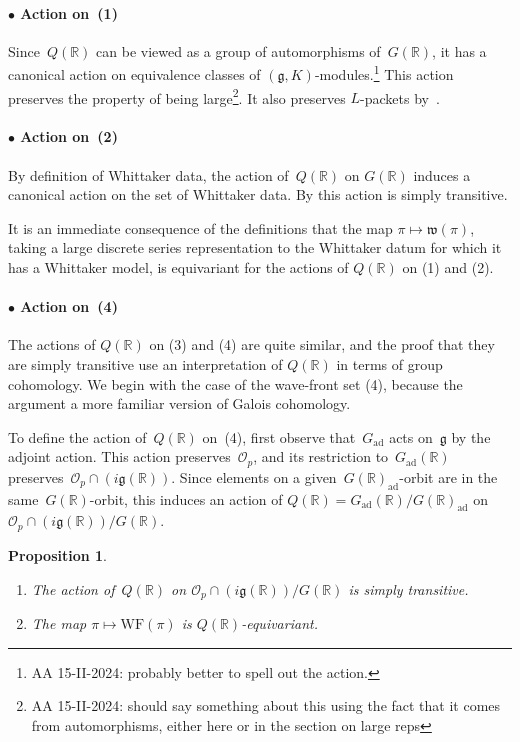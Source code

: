 \documentclass[10pt,leqno]{article}
\newtheorem{proposition}[equation]{Proposition}
\newcommand{\Gad}{G_\mathrm{ad}}
\renewcommand{\O}{\mathcal O}
\newcommand{\R}{\mathbb R}
\newcommand{\g}{\mathfrak g}
\newcommand{\w}{\mathfrak w}
\newcommand{\WF}{\mathrm{WF}}
\newcommand{\Op}{\O_p}
\begin{document}
\paragraph*{$\bullet$ Action on~(1)} Since~$Q(\R)$ can be viewed as a group of automorphisms of~$G(\R)$,  it has a canonical action on equivalence classes of $(\g, K)$-modules.\footnote{AA 15-II-2024: probably better to spell out the action.} This action preserves  the property of being large\footnote{AA 15-II-2024: should say something about this using the fact that it comes from automorphisms, either here or in the section on large reps}. It also preserves $L$-packets by~\cite[Lemma 6.18]{Contragredient}.

\paragraph*{$\bullet$ Action on~(2)}  By definition of Whittaker data, the action of~$Q(\R)$ on $G(\R)$ induces a canonical action on the set of Whittaker data. By \cite[(14.15)]{abv} this action is simply transitive. 

It is an immediate consequence of the definitions that the map $\pi \mapsto \w(\pi)$, taking a large discrete series representation to the Whittaker datum for which it has a Whittaker model, is equivariant for the actions of $Q(\R)$ on (1) and (2). 


\paragraph*{$\bullet$ Action on~(4)} The actions of $Q(\R)$ on (3) and (4) are quite similar, and the proof that they are simply transitive use an interpretation of $Q(\R)$ in terms of group cohomology. 
We begin with the case of the wave-front set (4), because the argument a more familiar version of  Galois cohomology. 

To define the action of~$Q(\R)$ on~(4), first observe that~$\Gad$ acts on~$\g$ by the adjoint action. This action preserves~$\Op$, and its restriction to~$\Gad(\R)$ preserves~$\Op\cap (i\g(\R))$. Since elements on a given~$G(\R)_{\mathrm{ad}}$-orbit are in the same~$G(\R)$-orbit, this induces an action of $Q(\R)=\Gad(\R)/G(\R)_{\mathrm{ad}}$ on~$\Op\cap (i\g(\R))/G(\R)$.

\begin{proposition}\label{prop:action_on_real_orbits}
\begin{enumerate} 
\item The action of~$Q(\R)$ on $\Op\cap (i\g(\R))/G(\R)$ is simply transitive.
\item The map $\pi \mapsto \WF(\pi)$ is $Q(\R)$-equivariant.
\end{enumerate}
\end{proposition}
\end{document}
